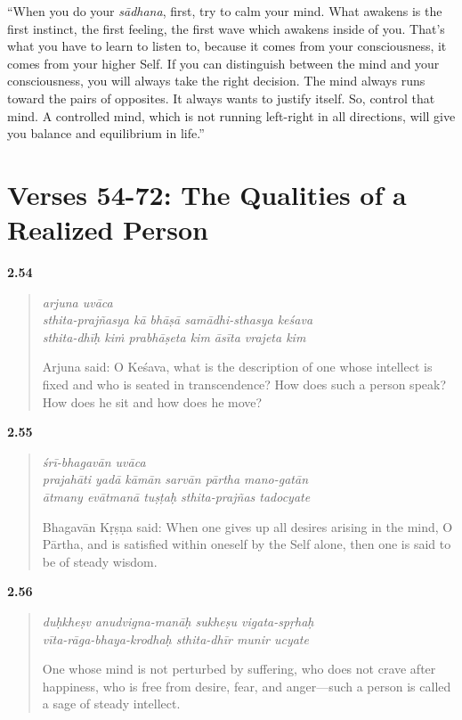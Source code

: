 \enquote{When you do your \textit{sādhana}, first, try to calm your mind. What awakens is the first instinct, the first feeling, the first wave which awakens inside of you. That's what you have to learn to listen to, because it comes from your consciousness, it comes from your higher Self. If you can distinguish between the mind and your consciousness, you will always take the right decision. The mind always runs toward the pairs of opposites. It always wants to justify itself. So, control that mind. A controlled mind, which is not running left-right in all directions, will give you balance and equilibrium in life.}

\section{Verses 54-72: The Qualities of a Realized Person}\label{sec-verses-54-72-the-qualities-of-a-realized-person}


\par\noindent\textbf{2.54}\par
\begin{verse}
\textit{arjuna uvāca} \\
\textit{sthita-prajñasya kā bhāṣā samādhi-sthasya keśava} \\
\textit{sthita-dhīḥ kiṁ prabhāṣeta kim āsīta vrajeta kim}

\noindent Arjuna said: O Keśava, what is the description of one whose intellect is fixed and who is seated in transcendence? How does such a person speak? How does he sit and how does he move?
\end{verse}
\par



\par\noindent\textbf{2.55}\par
\begin{verse}
\textit{śrī-bhagavān uvāca} \\
\textit{prajahāti yadā kāmān sarvān pārtha mano-gatān} \\
\textit{ātmany evātmanā tuṣṭaḥ sthita-prajñas tadocyate}

\noindent Bhagavān Kṛṣṇa said: When one gives up all desires arising in the mind, O Pārtha, and is satisfied within oneself by the Self alone, then one is said to be of steady wisdom.
\end{verse}
\par



\par\noindent\textbf{2.56}\par
\begin{verse}
\textit{duḥkheṣv anudvigna-manāḥ sukheṣu vigata-spṛhaḥ} \\
\textit{vīta-rāga-bhaya-krodhaḥ sthita-dhīr munir ucyate}

\noindent One whose mind is not perturbed by suffering, who does not crave after happiness, who is free from desire, fear, and anger---such a person is called a sage of steady intellect.
\end{verse}
\par



